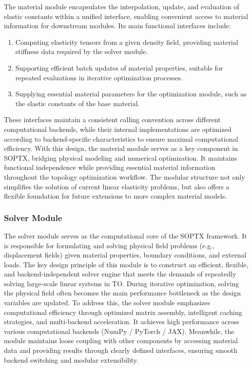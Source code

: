 \documentclass[mathpazo]{cicp}
\begin{document}
The material module encapsulates the interpolation, update, and evaluation of elastic constants within a unified interface, enabling convenient access to material information for downstream modules. Its main functional interfaces include:
\begin{enumerate}
	\item Computing elasticity tensors from a given density field, providing material stiffness data required by the solver module.
	\item Supporting efficient batch updates of material properties, suitable for repeated evaluations in iterative optimization processes.
	\item Supplying essential material parameters for the optimization module, such as the elastic constants of the base material.
\end{enumerate}
These interfaces maintain a consistent calling convention across different computational backends, while their internal implementations are optimized according to backend-specific characteristics to ensure maximal computational efficiency. With this design, the material module serves as a key component in SOPTX, bridging physical modeling and numerical optimization. It maintains functional independence while providing essential material information throughout the topology optimization workflow. The modular structure not only simplifies the solution of current linear elasticity problems, but also offers a flexible foundation for future extensions to more complex material models.

\subsubsection{Solver Module}
The solver module serves as the computational core of the SOPTX framework. It is responsible for formulating and solving physical field problems (e.g., displacement fields) given material properties, boundary conditions, and external loads. The key design principle of this module is to construct an efficient, flexible, and backend-independent solver engine that meets the demands of repeatedly solving large-scale linear systems in TO. During iterative optimization, solving the physical field often becomes the main performance bottleneck as the design variables are updated. To address this, the solver module emphasizes computational efficiency through optimized matrix assembly, intelligent caching strategies, and multi-backend acceleration. It achieves high performance across various computational backends (NumPy / PyTorch / JAX). Meanwhile, the module maintains loose coupling with other components by accessing material data and providing results through clearly defined interfaces, ensuring smooth backend switching and modular extensibility.
\end{document}
